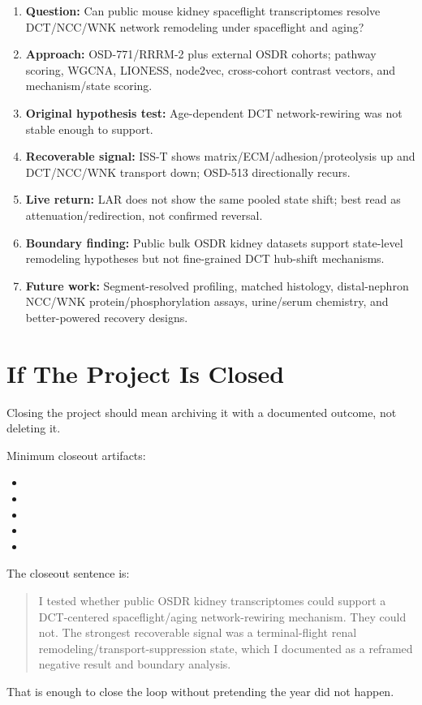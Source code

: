 \documentclass[11pt]{article}
\begin{document}
\begin{enumerate}
  \item \textbf{Question:} Can public mouse kidney spaceflight transcriptomes resolve DCT/NCC/WNK network remodeling under spaceflight and aging?
  \item \textbf{Approach:} OSD-771/RRRM-2 plus external OSDR cohorts; pathway scoring, WGCNA, LIONESS, node2vec, cross-cohort contrast vectors, and mechanism/state scoring.
  \item \textbf{Original hypothesis test:} Age-dependent DCT network-rewiring was not stable enough to support.
  \item \textbf{Recoverable signal:} ISS-T shows matrix/ECM/adhesion/proteolysis up and DCT/NCC/WNK transport down; OSD-513 directionally recurs.
  \item \textbf{Live return:} LAR does not show the same pooled state shift; best read as attenuation/redirection, not confirmed reversal.
  \item \textbf{Boundary finding:} Public bulk OSDR kidney datasets support state-level remodeling hypotheses but not fine-grained DCT hub-shift mechanisms.
  \item \textbf{Future work:} Segment-resolved profiling, matched histology, distal-nephron NCC/WNK protein/phosphorylation assays, urine/serum chemistry, and better-powered recovery designs.
\end{enumerate}

\section*{If The Project Is Closed}

Closing the project should mean archiving it with a documented outcome, not deleting it.

Minimum closeout artifacts:

\begin{itemize}
  \item {}
  \item {}
  \item {}
  \item {}
  \item {}
\end{itemize}

The closeout sentence is:

\begin{quote}
I tested whether public OSDR kidney transcriptomes could support a DCT-centered spaceflight/aging network-rewiring mechanism. They could not. The strongest recoverable signal was a terminal-flight renal remodeling/transport-suppression state, which I documented as a reframed negative result and boundary analysis.
\end{quote}

That is enough to close the loop without pretending the year did not happen.
\end{document}
